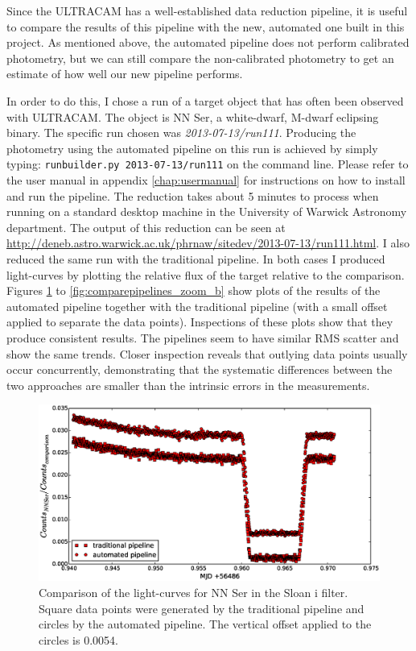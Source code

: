 Since the ULTRACAM has a well-established data reduction pipeline, it is useful to compare the results of this pipeline with the new, automated one built in this project. As mentioned above, the automated pipeline does not perform calibrated photometry, but we can still compare the non-calibrated photometry to get an estimate of how well our new pipeline performs.

In order to do this, I chose a run of a target object that has often been observed with ULTRACAM. The object is NN Ser, a white-dwarf, M-dwarf eclipsing binary. The specific run chosen was \emph{2013-07-13/run111}. Producing the photometry using the automated pipeline on this run is achieved by simply typing: \texttt{runbuilder.py 2013-07-13/run111} on the command line. Please refer to the user manual in appendix \ref{chap:usermanual} for instructions on how to install and run the pipeline.  The reduction takes about 5 minutes to process when running on a standard desktop machine in the University of Warwick Astronomy department. The output of this reduction can be seen at \url{http://deneb.astro.warwick.ac.uk/phrnaw/sitedev/2013-07-13/run111.html}. I also reduced the same run with the traditional pipeline. In both cases I produced light-curves by plotting the relative flux of the target relative to the comparison. Figures \ref{fig:comparepipelines_r} to \ref{fig:comparepipelines_zoom_b} show plots of the results of the automated pipeline together with the traditional pipeline (with a small offset applied to separate the data points). Inspections of these plots show that they produce consistent results. The pipelines seem to have similar RMS scatter and show the same trends. Closer inspection reveals that outlying data points usually occur concurrently,  demonstrating that the systematic differences between the two approaches are smaller than the intrinsic errors in the measurements. 

\begin{figure}
\centering
\includegraphics[width=140mm]{images/nn_ser_compare_r.eps}
\caption{Comparison of the light-curves for NN Ser in the Sloan i filter. Square data points were generated by the traditional pipeline and circles by the automated pipeline. The vertical offset applied to the circles is 0.0054. }
\label{fig:comparepipelines_r}
\end{figure}

